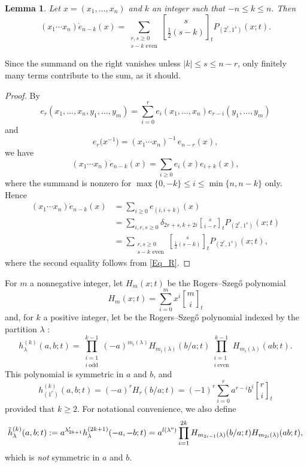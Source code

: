 \documentclass[pdftex]{sigma}
\numberwithin{equation}{section}
\newtheorem{Lemma}[Theorem]{Lemma}
\renewcommand{\leq}{\leqslant}
\renewcommand{\geq}{\geqslant}
\newcommand{\odd}{\textup{o}}
\newcommand{\qbin}[2]{\genfrac{[}{]}{0pt}{}{#1}{#2}}
\newcommand{\abs}[1]{\vert#1\vert}
\newcommand{\la}{\lambda}
\begin{document}
\begin{Lemma}\label{Lem_eP}
Let $x=(x_1,\dots,x_n)$ and $k$ an integer such that $-n\leq k\leq n$.
Then
\begin{equation*}%
(x_1\cdots x_n) \dot{e}_{n-k}(x)=
\sum_{\substack{r,s\geq 0\\[1pt] s-k \text{ even}}}
\qbin{s}{\frac{1}{2}(s-k)}_t P_{(2^r,1^s)}(x;t).
\end{equation*}
\end{Lemma}

Since the summand on the right vanishes unless $\abs{k}\leq s\leq n-r$,
only finitely many terms contribute to the sum, as it should.

\begin{proof}
By
\begin{equation}\label{Eq_branching}
e_r(x_1,\dots,x_n,y_1,\dots,y_m)=
\sum_{i=0}^r e_i(x_1,\dots,x_n) e_{r-i}(y_1,\dots,y_m)
\end{equation}
and
\[
e_r\bigl(x^{-1}\bigr)=(x_1\cdots x_n)^{-1}\, e_{n-r}(x),
\]
we have
\[
(x_1\cdots x_n) \dot{e}_{n-k}(x)=\sum_{i\geq 0} e_i(x) e_{i+k}(x),
\]
where the summand is nonzero for $\max\{0,-k\}\leq i\leq \min\{n,n-k\}$
only.
Hence
\begin{align*}
(x_1\cdots x_n) \dot{e}_{n-k}(x)
&=\sum_{i\geq 0} e_{(i,i+k)}(x) \\
&=\sum_{i,r,s\geq 0}
\delta_{2r+s,k+2i}\qbin{s}{i-r}_t P_{(2^r,1^s)}(x;t) \\
&=\sum_{\substack{r,s\geq 0\\[1pt] s-k \text{ even}}}
\qbin{s}{\frac{1}{2}(s-k)}_t P_{(2^r,1^s)}(x;t),
\end{align*}
where the second equality follows from \eqref{Eq_R}.
\end{proof}

For $m$ a nonnegative integer, let $H_m(x;t)$ be the
Rogers--Szeg\H{o} polynomial \cite[p.~49]{Andrews76}
\begin{equation}\label{Eq_RS}
H_m(x;t)=\sum_{i=0}^m x^i \qbin{m}{i}_t
\end{equation}
and, for $k$ a positive integer, let \smash{$h_{\la}^{(k)}(a,b;t)$} be the
Rogers--Szeg\H{o} polynomial indexed by the partition $\la$
\cite{BW15,RW21}:
\[
h_{\la}^{(k)}(a,b;t)=
\prod_{\substack{i=1 \\[1pt] i~\text{odd}}}^{k-1}
(-a)^{m_i(\la)}H_{m_i(\la)}(b/a;t)
\prod_{\substack{i=1 \\[1pt] i~\text{even}}}^{k-1}
H_{m_i(\la)}(ab;t).
\]
This polynomial is symmetric in $a$ and $b$, and
\[
h_{(1^r)}^{(k)}(a,b;t)=(-a)^r H_r(b/a;t)=
(-1)^r \sum_{i=0}^r a^{r-i}b^i \qbin{r}{i}_t
\]
provided that $k\geq 2$.
For notational convenience, we also define
\[
\tilde{h}_{\la}^{(k)}(a,b;t):=
a^{\la'_{2k+1}} h_{\la}^{(2k+1)}(-a,-b;t)
= a^{l(\la^{\odd})}
\prod_{i=1}^{2k} H_{m_{2i-1}(\la)}(b/a;t) H_{m_{2i}(\la)}(ab;t),
\]
which is \emph{not} symmetric in $a$ and $b$.
\end{document}
